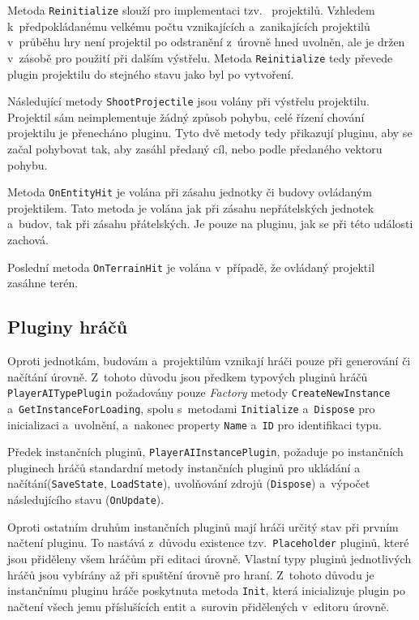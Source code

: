 Metoda \texttt{Reinitialize} slouží pro implementaci tzv.~ projektilů. Vzhledem k~předpokládanému velkému počtu vznikajících a~zanikajících projektilů v~průběhu hry není projektil po odstranění z~úrovně hned uvolněn, ale je držen v~zásobě pro použití při dalším výstřelu. Metoda \texttt{Reinitialize} tedy převede plugin projektilu do stejného stavu jako byl po vytvoření.

Následující metody \texttt{ShootProjectile} jsou volány při výstřelu projektilu. Projektil sám neimplementuje žádný způsob pohybu, celé řízení chování projektilu je přenecháno pluginu. Tyto dvě metody tedy přikazují pluginu, aby se začal pohybovat tak, aby zasáhl předaný cíl, nebo podle předaného vektoru pohybu.

Metoda \texttt{OnEntityHit} je volána při zásahu jednotky či budovy ovládaným projektilem. Tato metoda je volána jak při zásahu nepřátelských jednotek a~budov, tak při zásahu přátelských. Je pouze na pluginu, jak se při této události zachová.

Poslední metoda \texttt{OnTerrainHit} je volána v~případě, že ovládaný projektil zasáhne terén.

\subsection{Pluginy hráčů}
Oproti jednotkám, budovám a~projektilům vznikají hráči pouze při generování či načítání úrovně. Z~tohoto důvodu jsou předkem typových pluginů hráčů \texttt{PlayerAITypePlugin} požadovány pouze \textit{Factory} metody \texttt{CreateNewInstance} a~\texttt{GetInstanceForLoading}, spolu s~metodami \texttt{Initialize} a~\texttt{Dispose} pro inicializaci a~uvolnění, a~nakonec property \texttt{Name} a~\texttt{ID} pro identifikaci typu.


Předek instančních pluginů, \texttt{PlayerAIInstancePlugin}, požaduje po instančních pluginech hráčů standardní metody instančních pluginů pro ukládání a načítání(\texttt{SaveState}, \texttt{LoadState}), uvolňování zdrojů (\texttt{Dispose}) a~výpočet následujícího stavu (\texttt{OnUpdate}).

Oproti ostatním druhům instančních pluginů mají hráči určitý stav při prvním načtení pluginu. To nastává z~důvodu existence tzv.~\texttt{Placeholder} pluginů, které jsou přiděleny všem hráčům při editaci úrovně. Vlastní typy pluginů jednotlivých hráčů jsou vybírány až při spuštění úrovně pro hraní. Z~tohoto důvodu je instančnímu pluginu hráče poskytnuta metoda \texttt{Init}, která inicializuje plugin po načtení všech jemu příslušících entit a~surovin přidělených v~editoru úrovně.

